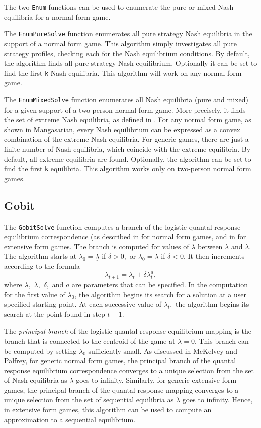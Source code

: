 The two {\tt Enum} functions can be used to enumerate the pure or
mixed Nash equilibria for a normal form game.

The {\tt EnumPureSolve} function enumerates all pure strategy Nash
equilibria in the support of a normal form game.  This algorithm
simply investigates all pure strategy profiles, checking each for the
Nash equilibrium conditions.  By default, the algorithm finds all pure
strategy Nash equilibrium.  Optionally it can be set to find the first
\verb+k+ Nash equilibria.  This algorithm will work on any normal form
game.

The {\tt EnumMixedSolve} function enumerates all Nash equilibria (pure
and mixed) for a given support of a two person normal form game.  More
precisely, it finds the set of extreme Nash equilibria, as defined in
\cite[1964]{Man:64}.  For any normal form game, as shown in
Mangasarian, every Nash equilibrium can be expressed as a convex
combination of the extreme Nash equilibria.  For generic games, there
are just a finite number of Nash equilibria, which coincide with the
extreme equilibria.  By default, all extreme equilibria are found.
Optionally, the algorithm can be set to find the first \verb+k+
equilibria.  This algorithm works only on two-person normal form
games.

\subsection{Gobit}

The {\tt GobitSolve} function computes a branch of the logistic
quantal response equilibrium correspondence (as described in
\cite{McKPal:95a} for normal form games, and in
\cite{McKPal:95b} for extensive form games.  The branch is
computed for values of $\lambda$ between $\underline{\lambda}$ and
$\bar{\lambda}.$ The algorithm starts at $\lambda_0 =
\underline{\lambda}$ if $\delta>0,$ or $\lambda_0 = \bar{\lambda}$ if
$\delta<0$. It then increments according to the formula
$$
\lambda_{t+1} = \lambda_t +\delta \lambda_t^a,
$$ 
where $\underline\lambda,$ $\bar\lambda,$ $\delta,$ and $a$ are
parameters that can be specified.  In the computation for the first value of
$\lambda_0$, the algorithm begins its search for a solution at a user
specified starting point.  At each
successive value of $\lambda_t,$ the algorithm begins its search at
the point found in step $t - 1.$ 

The {\em principal branch} of the logistic quantal response
equilibrium mapping is the branch that is connected to the centroid of
the game at $\lambda = 0$.  This branch can be computed by setting
$\lambda_0$ sufficiently small.  As discussed in McKelvey and Palfrey,
for generic normal form games, the principal branch of the quantal
response equilibrium correspondence converges to a unique selection
from the set of Nash equilibria as $\lambda$ goes to infinity.
Similarly, for generic extensive form games, the principal branch of
the quantal response mapping converges to a unique selection from the
set of sequential equilibria as $\lambda$ goes to infinity.  Hence, in
extensive form games, this algorithm can be used to compute an
approximation to a sequential equilibrium.

